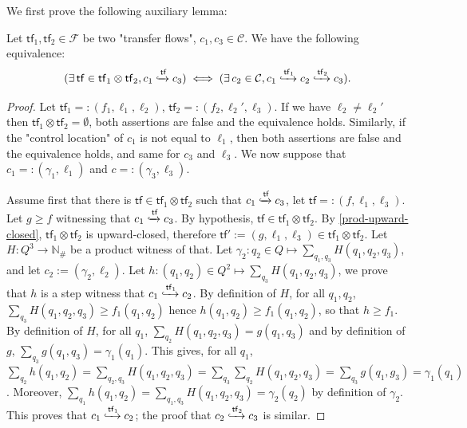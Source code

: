 \documentclass[10pt,a4paper]{article}
\let\mathbb\mathds
\renewcommand{\geq}{\geqslant}
\newcommand{\nats}{\mathbb{N}}
\newcommand{\deff}{:=}
\newcommand{\config}{\gamma}
\newcommand*{\states}{Q}
\newcommand*{\abuchistate}{\ell}
\newcommand*{\controlloc}{\abuchistate}
\newcommand{\prodconfigs}{\mathcal{C}}
\newcommand{\prodconfig}{c}
\newcommand*{\dummysymb}{\#}
\newcommand*{\natsanddummy}{\nats_{\dummysymb}}
\newcommand*{\transferflows}{\mathcal{F}}
\newcommand*{\atf}{\mathsf{tf}}
\newcommand*{\tftimes}{\otimes}
\newcommand*{\flowstep}[1]{\xhookrightarrow{#1}}
\newcommand*{\confpair}[2]{(#1,#2)}
\begin{document}
\begin{appendixproof}
	We first prove the following auxiliary lemma:
	\begin{lemma}
		\label{product-basic-property}
		Let \(\atf_1, \atf_2 \in \transferflows\) be two "transfer flows", \(\prodconfig_1, \prodconfig_3 \in \prodconfigs\).
		We have the following equivalence:
		\begin{equation*}
			( \exists \,  \atf \in \atf_1 \tftimes \atf_2, \prodconfig_1 \flowstep{\atf} \prodconfig_3 )
			\iff ( \exists \, \prodconfig_2 \in \prodconfigs, \prodconfig_1 \flowstep{\atf_1} \prodconfig_2 \flowstep{\atf_2} \prodconfig_3 ). \end{equation*}
	\end{lemma}
	\begin{proof}
		Let \(\atf_1 =: (f_1, \controlloc_1, \controlloc_2)\), \(\atf_2 =: (f_2, \controlloc_2', \controlloc_3)\).
		If we have \(\controlloc_2 \ne \controlloc_2'\) then \(\atf_1 \tftimes \atf_2 = \emptyset\), both assertions are false and the equivalence holds.
		Similarly, if the "control location" of \(\prodconfig_1\) is not equal to \(\controlloc_1\), then both assertions are false and the equivalence holds, and same for \(\prodconfig_3\) and \(\controlloc_3\).
		We now suppose that \(\prodconfig_1 =: \confpair{\config_1}{\controlloc_1}\) and \(\prodconfig =: \confpair{\config_3}{\controlloc_3}\).

		Assume first that there is \(\atf \in \atf_1 \tftimes \atf_2\) such that \(\prodconfig_1 \flowstep{\atf} \prodconfig_3\), let \(\atf =: (f, \controlloc_1, \controlloc_3)\).
		Let \(g \geq f\) witnessing that \(\prodconfig_1 \flowstep{\atf} \prodconfig_3\).
		By hypothesis, \(\atf \in \atf_1 \tftimes \atf_2\).
		By \cref{prod-upward-closed}, \(\atf_1 \tftimes \atf_2\) is upward-closed, therefore \(\atf' \deff (g,\controlloc_1,\controlloc_3) \in \atf_1 \tftimes \atf_2\).
		Let \(H : \states^3 \to \natsanddummy\) be a product witness of that.
		Let \(\config_2 : q_2 \in \states \mapsto \sum_{q_1,q_3} H(q_1,q_2,q_3)\), and let \(\prodconfig_2 \deff \confpair{\config_2}{\controlloc_2}\).
		Let \(h : (q_1,q_2) \in \states^2 \mapsto \sum_{q_3} H(q_1,q_2,q_3)\), we prove that \(h\) is a step witness that \(\prodconfig_1 \flowstep{\atf_1} \prodconfig_2\).
		By definition of \(H\), for all \(q_1,q_2\), \(\sum_{q_3} H(q_1,q_2,q_3) \geq f_1(q_1,q_2)\) hence \(h(q_1, q_2) \geq f_1(q_1,q_2)\), so that \(h \geq f_1\).
		By definition of \(H\), for all \(q_1\), \(\sum_{q_2} H(q_1,q_2,q_3) = g(q_1,q_3)\) and by definition of \(g\), \(\sum_{q_3} g(q_1,q_3) = \config_1(q_1)\).
		This gives, for all \(q_1\), \(\sum_{q_2} h(q_1,q_2) = \sum_{q_2,q_3} H(q_1,q_2,q_3) = \sum_{q_3} \sum_{q_2} H(q_1,q_2,q_3) = \sum_{q_3} g(q_1,g_3) = \config_1(q_1)\).
		Moreover, \(\sum_{q_1} h(q_1,q_2) = \sum_{q_1,q_3} H(q_1,q_2,q_3) = \config_2(q_2)\) by definition of \(\config_2\).
		This proves that \(\prodconfig_1 \flowstep{\atf_1} \prodconfig_2\); the proof that \(\prodconfig_2 \flowstep{\atf_2} \prodconfig_3\) is similar.


\end{proof}
\end{appendixproof}
\end{document}
